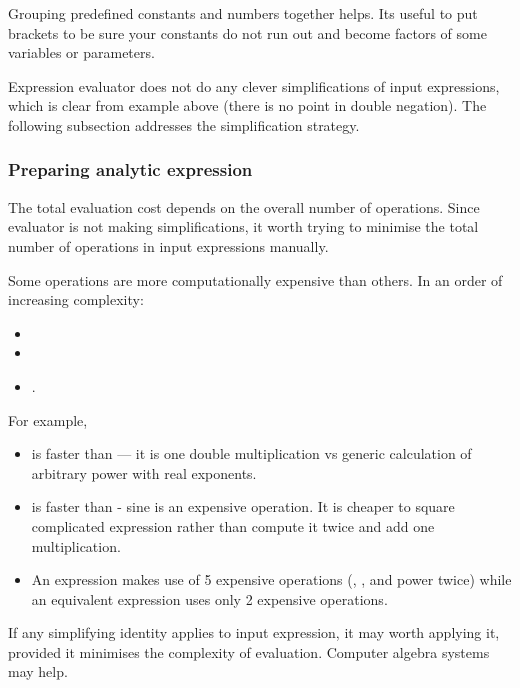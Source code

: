 Grouping predefined constants and numbers together helps. Its useful to put
brackets to be sure your constants do not run out and become factors of some
variables or parameters.

Expression evaluator does not do any clever simplifications of input
expressions, which is clear from example above (there is no point in double
negation). The following subsection addresses the simplification strategy.

\subsubsection{Preparing analytic expression}

The total evaluation cost depends on the overall number of operations. Since
evaluator is not making simplifications, it worth trying to minimise the total
number of operations in input expressions manually.

Some operations are more computationally expensive than others. In an order of
increasing complexity:
\begin{itemize}
\item \inlsh{+, -, <, >, <=, >=, ==, }
\item {}
\item {}.
\end{itemize}

For example,
\begin{itemize}
\item {} is faster than  --- it is one double
multiplication vs generic calculation of arbitrary power with real exponents.
\item {} is faster than  -
sine is an expensive operation. It is cheaper to square complicated expression rather than
 compute it twice and add one multiplication.
\item An expression
 makes use of 5 expensive operations (, , 
 and power \inlsh{\^{}} twice) while an equivalent expression
 uses only 2 expensive operations.
\end{itemize}

If any simplifying identity applies to input expression, it may worth applying
it, provided it minimises the complexity of evaluation. Computer algebra systems
may help.

